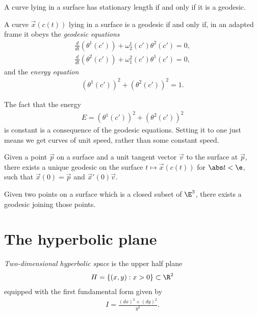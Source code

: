 \documentclass{article}
\begin{document}
\begin{proposition}[Notes 12.7]
	A curve lying in a surface has stationary length if and only if it is a geodesic.
\end{proposition}

\begin{proposition}[Notes 12.9]
	A curve $\vec x(c(t))$ lying in a surface is a geodesic if and only if, in an adapted frame
	it obeys the \emph{geodesic equations}
	\begin{align*}
		\frac{d}{dt}(\theta^1 (c')) + \omega_2^1(c')\theta^2(c') = 0, \\
		\frac{d}{dt}(\theta^2 (c')) + \omega_1^2(c')\theta^1(c') = 0,
	\end{align*}
	and the \emph{energy equation}
	\begin{align*}
		(\theta^1(c'))^2 + (\theta^2(c'))^2 = 1.
	\end{align*}
\end{proposition}

\begin{proposition}[Notes 12.11]
	The fact that the energy
	\begin{align*}
		E = (\theta^1(c'))^2 + (\theta^2(c'))^2
	\end{align*}
	is constant is a consequence of the geodesic equations. Setting it to one just means we get
	curves of unit speed, rather than some constant speed.
\end{proposition}

\begin{proposition}[Notes 12.12]
	Given a point $\vec p$ on a surface and a unit tangent vector $\vec v$ to the surface at $\vec p$,
	there exists a unique geodesic on the surface $t\mapsto \vec x(c(t))$ for $\abs t < \e$,
	such that $\vec x(0) =\vec p$ and $\vec x'(0) \vec v$.
\end{proposition}

\begin{lemma}
	Given two points on a surface which is a closed subset of $\E^3$, there exists a geodesic
	joining those points.
\end{lemma}

\section{The hyperbolic plane}

\begin{definition}
	\emph{Two-dimensional hyperbolic space} is the upper half plane
	\begin{align*}
		H = \{(x,y) : x > 0\}\subset\R^2
	\end{align*}
	equipped with the first fundamental form given by
	\begin{align*}
		I = \frac{(dx)^2 + (dy)^2}{y^2}.
	\end{align*}
\end{definition}
\end{document}
